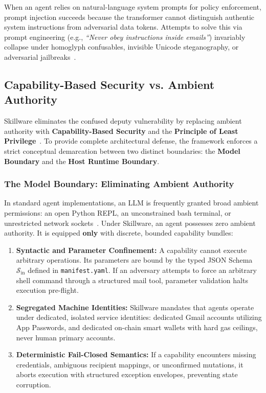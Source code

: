 When an agent relies on natural-language system prompts for policy enforcement, prompt injection succeeds because the transformer cannot distinguish authentic system instructions from adversarial data tokens. Attempts to solve this via prompt engineering (e.g., \emph{``Never obey instructions inside emails''}) invariably collapse under homoglyph confusables, invisible Unicode steganography, or adversarial jailbreaks~\cite{perez2022ignore}.

\subsection{Capability-Based Security vs. Ambient Authority}
\label{subsec:least_privilege}

Skillware eliminates the confused deputy vulnerability by replacing ambient authority with \textbf{Capability-Based Security} and the \textbf{Principle of Least Privilege}~\cite{saltzer1975protection, dennis1966programming, miller2006robust}. To provide complete architectural defense, the framework enforces a strict conceptual demarcation between two distinct boundaries: the \textbf{Model Boundary} and the \textbf{Host Runtime Boundary}.

\subsubsection{The Model Boundary: Eliminating Ambient Authority}
In standard agent implementations, an LLM is frequently granted broad ambient permissions: an open Python REPL, an unconstrained bash terminal, or unrestricted network sockets~\cite{wang2024survey}. Under Skillware, an agent possesses zero ambient authority. It is equipped \textbf{only} with discrete, bounded capability bundles:
\begin{enumerate}[leftmargin=*]
  \item \textbf{Syntactic and Parameter Confinement:} A capability cannot execute arbitrary operations. Its parameters are bound by the typed JSON Schema $\mathcal{S}_{\text{in}}$ defined in \texttt{manifest.yaml}. If an adversary attempts to force an arbitrary shell command through a structured mail tool, parameter validation halts execution pre-flight.
  \item \textbf{Segregated Machine Identities:} Skillware mandates that agents operate under dedicated, isolated service identities: dedicated Gmail accounts utilizing App Passwords, and dedicated on-chain smart wallets with hard gas ceilings, never human primary accounts.
  \item \textbf{Deterministic Fail-Closed Semantics:} If a capability encounters missing credentials, ambiguous recipient mappings, or unconfirmed mutations, it aborts execution with structured exception envelopes, preventing state corruption.
\end{enumerate}

